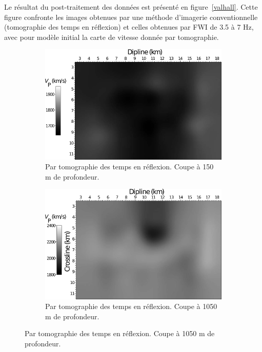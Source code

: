 Le résultat du post-traitement des données est présenté en figure~\ref{valhall}. Cette figure confronte les images obtenues par une méthode d'imagerie conventionnelle (tomographie des temps en réflexion) et celles obtenues par FWI de 3.5 à 7 Hz, avec pour modèle initial la carte de vitesse donnée par tomographie.

\begin{figure}[!h]
    \centering
    \begin{subfigure}[b]{0.4\textwidth}
        \includegraphics[width=\textwidth]{img/geophy1.png}
        \caption{ Par tomographie des temps en réflexion. Coupe à 150 m de profondeur.}
        \label{}
    \end{subfigure}
    \hspace{0.5cm}
    \begin{subfigure}[b]{0.4\textwidth}
        \includegraphics[width=\textwidth]{img/geophy2.png}
        \caption{Par tomographie des temps en réflexion. Coupe à 1050 m de profondeur.}

\end{subfigure}
\end{figure}
